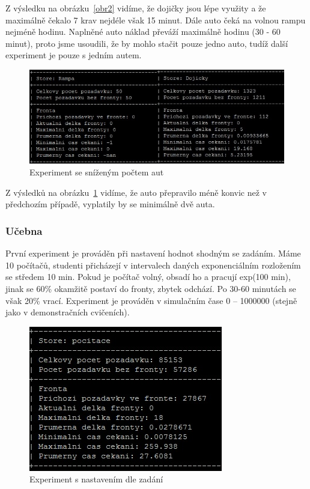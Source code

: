 \documentclass[12pt,a4paper,titlepage,final]{article}
\begin{document}
Z výsledku na obrázku~\ref{obr2} vidíme, že dojičky jsou lépe využity a že maximálně čekalo 7 krav nejdéle však 15 minut. Dále auto čeká na volnou rampu nejméně hodinu. Naplněné auto náklad převáží maximálně hodinu (30 - 60 minut), proto jsme usoudili, že by mohlo stačit pouze jedno auto, tudíž další experiment je pouze s jedním autem.

\begin{figure}[!h] 
 	\centering
	 \includegraphics[]{kravy3.jpg}
\caption{Experiment se sníženým počtem aut}
\label{obr3}
\end{figure}

Z výsledků na obrázku~\ref{obr3} vidíme, že auto přepravilo méně konvic než v předchozím případě, vyplatily by se minimálně dvě auta. 

\subsubsection{Učebna}

První experiment je prováděn při nastavení hodnot shodným se zadáním. Máme 10 počítačů, studenti přicházejí v intervalech daných exponenciálním rozložením se středem 10 min. Pokud je počítač volný, obsadí ho a pracují exp(100 min), jinak se 60\% okamžitě postaví do fronty, zbytek odchází. Po 30-60 minutách se však 20\% vrací. Experiment je prováděn v simulačním čase 0 -- 1000000 (stejně jako v demonstračních cvičeních).

\begin{figure}[!h] 
 	\centering
	 \includegraphics[]{ucebna1.jpg}
\caption{Experiment s nastavením dle zadání}
\label{obr4}
\end{figure}
\end{document}
